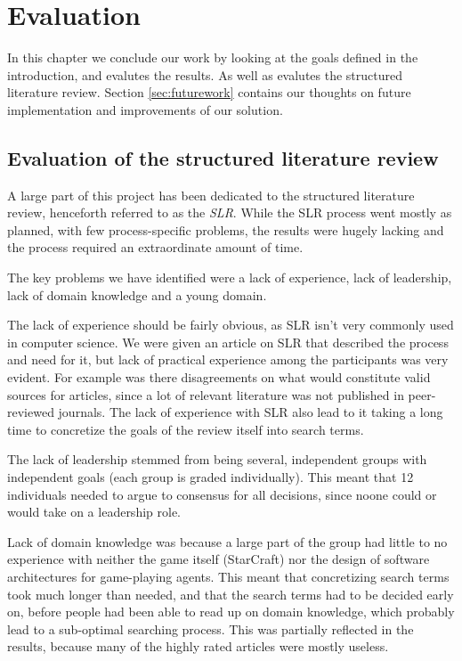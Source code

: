 
\chapter{Evaluation}
In this chapter we conclude our work by looking at the goals defined in the introduction, and evalutes the results. As well as evalutes the structured literature review. Section \ref{sec:futurework} contains our thoughts on future implementation and improvements of our solution.

\section{Evaluation of the structured literature review}
A large part of this project has been dedicated to the structured literature
review, henceforth referred to as the \textit{SLR}. While the SLR process went
mostly as planned, with few process-specific problems, the results were hugely
lacking and the process required an extraordinate amount of time.

The key problems we have identified were a lack of experience, lack of
leadership, lack of domain knowledge and a young domain.

The lack of experience should be fairly obvious, as SLR isn't very commonly
used in computer science. We were given an article on SLR that described the
process and need for it, but lack of practical experience among the
participants was very evident. For example was there disagreements on what
would constitute valid sources for articles, since a lot of relevant literature
was not published in peer-reviewed journals. The lack of
experience with SLR also lead to it taking a long time to concretize the goals
of the review itself into search terms.

The lack of leadership stemmed from being several, independent groups with
independent goals (each group is graded individually). This meant that 12
individuals needed to argue to consensus for all decisions, since noone could
or would take on a leadership role.

Lack of domain knowledge was because a large part of the group had little to no
experience with neither the game itself (StarCraft) nor the design of software
architectures for game-playing agents. This meant that concretizing search
terms took much longer than needed, and that the search terms had to be
decided early on, before people had been able to read up on domain knowledge,
which probably lead to a sub-optimal searching process. This was partially
reflected in the results, because many of the highly rated articles were mostly
useless.

